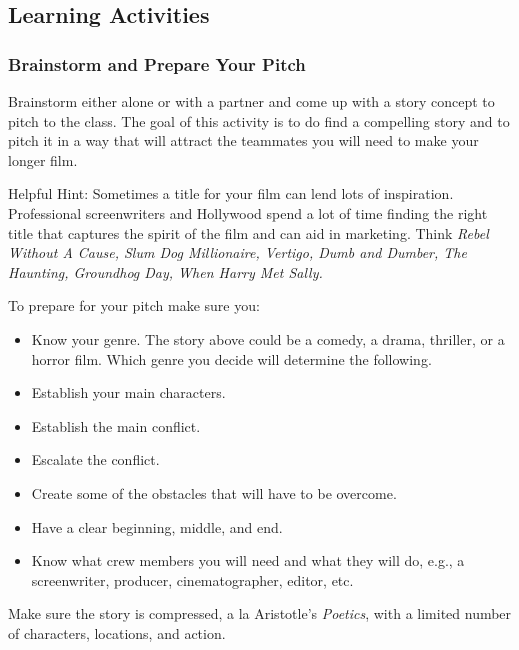 \documentclass[
]{book}
\providecommand{\tightlist}{%
  \setlength{\itemsep}{0pt}\setlength{\parskip}{0pt}}
\begin{document}
\hypertarget{learning-activities-8}{%
\subsection*{Learning Activities}\label{learning-activities-8}}

\begin{reflect}
\hypertarget{brainstorm-and-prepare-your-pitch}{%
\subsubsection*{Brainstorm and Prepare Your Pitch}\label{brainstorm-and-prepare-your-pitch}}

Brainstorm either alone or with a partner and come up with a story concept to pitch to the class. The goal of this activity is to do find a compelling story and to pitch it in a way that will attract the teammates you will need to make your longer film.

Helpful Hint: Sometimes a title for your film can lend lots of inspiration. Professional screenwriters and Hollywood spend a lot of time finding the right title that captures the spirit of the film and can aid in marketing. Think \emph{Rebel Without A Cause, Slum Dog Millionaire, Vertigo, Dumb and Dumber, The
Haunting, Groundhog Day, When Harry Met Sally.}

To prepare for your pitch make sure you:

\begin{itemize}
\tightlist
\item
  Know your genre. The story above could be a comedy, a drama, thriller, or a horror film. Which genre you decide will determine the following.\\
\item
  Establish your main characters.\\
\item
  Establish the main conflict.\\
\item
  Escalate the conflict.\\
\item
  Create some of the obstacles that will have to be overcome.\\
\item
  Have a clear beginning, middle, and end.\\
\item
  Know what crew members you will need and what they will do, e.g., a screenwriter, producer, cinematographer, editor, etc.
\end{itemize}

Make sure the story is compressed, a la Aristotle's \emph{Poetics}, with a limited number of characters, locations, and action.
\end{reflect}
\end{document}
